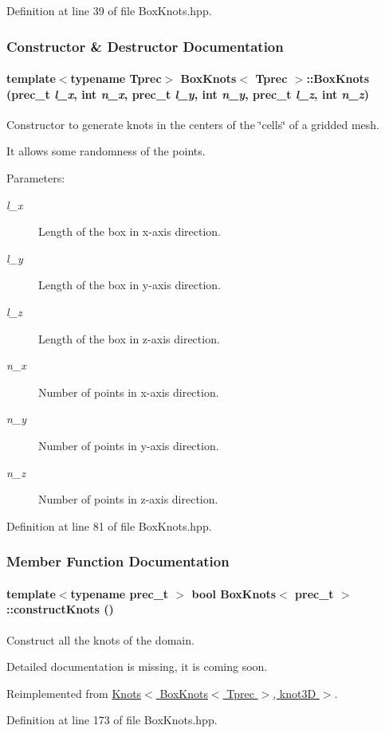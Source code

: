 Definition at line 39 of file BoxKnots.hpp.

\subsubsection{Constructor \& Destructor Documentation}
\hypertarget{classBoxKnots_68a97e9465882cc4ad631a8437d10d17}{
\paragraph[{BoxKnots}]{\setlength{\rightskip}{0pt plus 5cm}template$<$typename Tprec$>$ {\bf BoxKnots}$<$ Tprec $>$::{\bf BoxKnots} (prec\_\-t {\em l\_\-x}, \/  int {\em n\_\-x}, \/  prec\_\-t {\em l\_\-y}, \/  int {\em n\_\-y}, \/  prec\_\-t {\em l\_\-z}, \/  int {\em n\_\-z})}\hfill}
\label{classBoxKnots_68a97e9465882cc4ad631a8437d10d17}


Constructor to generate knots in the centers of the \char`\"{}cells\char`\"{} of a gridded mesh. 

It allows some randomness of the points. \begin{Desc}
\item[Parameters:]
\begin{description}
\item[{\em l\_\-x}]Length of the box in x-axis direction. \item[{\em l\_\-y}]Length of the box in y-axis direction. \item[{\em l\_\-z}]Length of the box in z-axis direction. \item[{\em n\_\-x}]Number of points in x-axis direction. \item[{\em n\_\-y}]Number of points in y-axis direction. \item[{\em n\_\-z}]Number of points in z-axis direction. \end{description}
\end{Desc}


Definition at line 81 of file BoxKnots.hpp.

\subsubsection{Member Function Documentation}
\hypertarget{classBoxKnots_fe5f5142f80f351546584e3a0ad8e7eb}{
\paragraph[{constructKnots}]{\setlength{\rightskip}{0pt plus 5cm}template$<$typename prec\_\-t $>$ bool {\bf BoxKnots}$<$ prec\_\-t $>$::constructKnots ()}\hfill}
\label{classBoxKnots_fe5f5142f80f351546584e3a0ad8e7eb}


Construct all the knots of the domain. 

Detailed documentation is missing, it is coming soon. 

Reimplemented from \hyperlink{classKnots_8e622932aee837d4c3465093f3158ebb}{Knots$<$ BoxKnots$<$ Tprec $>$, knot3D $>$}.

Definition at line 173 of file BoxKnots.hpp.